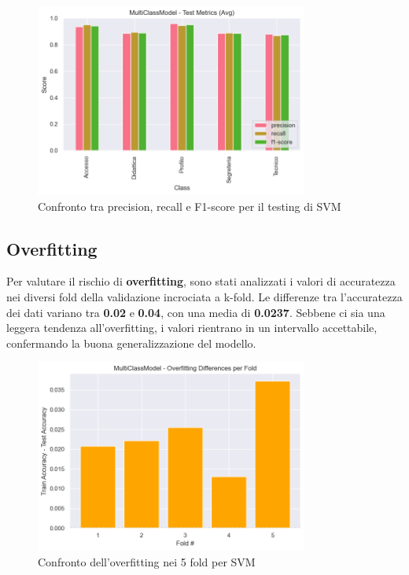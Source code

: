 \begin{figure}[H]
    \centering
    \includegraphics[width=0.8\textwidth]{images/metrics_test_svm.png}
    \caption{Confronto tra precision, recall e F1-score per il testing di SVM}
    \label{fig:metrics_test_svm}
\end{figure}

\subsection{Overfitting}

Per valutare il rischio di \textbf{overfitting}, sono stati analizzati i valori di accuratezza nei diversi fold della validazione incrociata a k-fold. Le differenze tra l'accuratezza dei dati variano tra \textbf{0.02} e \textbf{0.04}, con una media di \textbf{0.0237}. Sebbene ci sia una leggera tendenza all'overfitting, i valori rientrano in un intervallo accettabile, confermando la buona generalizzazione del modello.

\begin{figure}[H]
    \centering
    \includegraphics[width=0.8\textwidth]{images/overfitting_svm.png}
    \caption{Confronto dell'overfitting nei 5 fold per SVM}
    \label{fig:overfitting_svm}
\end{figure}

